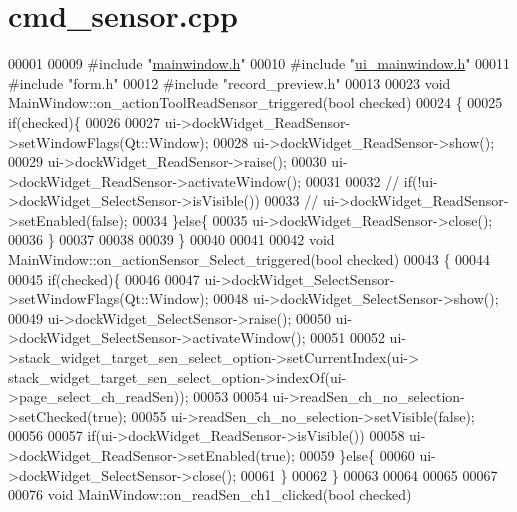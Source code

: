 \hypertarget{a00030_source}{\section{cmd\+\_\+sensor.\+cpp}
\label{a00030_source}
}

\begin{DoxyCode}
00001 
00009 \textcolor{preprocessor}{#include "\hyperlink{a00039}{mainwindow.h}"}
00010 \textcolor{preprocessor}{#include "\hyperlink{a00052}{ui\_mainwindow.h}"}
00011 \textcolor{preprocessor}{#include "form.h"}
00012 \textcolor{preprocessor}{#include "record\_preview.h"}
00013 
00023 \textcolor{keywordtype}{void} MainWindow::on\_actionToolReadSensor\_triggered(\textcolor{keywordtype}{bool} checked)
00024 \{
00025     \textcolor{keywordflow}{if}(checked)\{
00026 
00027         ui->dockWidget\_ReadSensor->setWindowFlags(Qt::Window);
00028         ui->dockWidget\_ReadSensor->show();
00029         ui->dockWidget\_ReadSensor->raise();
00030         ui->dockWidget\_ReadSensor->activateWindow();
00031 
00032       \textcolor{comment}{//  if(!ui->dockWidget\_SelectSensor->isVisible())}
00033            \textcolor{comment}{// ui->dockWidget\_ReadSensor->setEnabled(false);}
00034     \}\textcolor{keywordflow}{else}\{
00035         ui->dockWidget\_ReadSensor->close();
00036     \}
00037 
00038 
00039 \}
00040 
00041 
00042 \textcolor{keywordtype}{void} MainWindow::on\_actionSensor\_Select\_triggered(\textcolor{keywordtype}{bool} checked)
00043 \{
00044 
00045     \textcolor{keywordflow}{if}(checked)\{
00046 
00047         ui->dockWidget\_SelectSensor->setWindowFlags(Qt::Window);
00048         ui->dockWidget\_SelectSensor->show();
00049         ui->dockWidget\_SelectSensor->raise();
00050         ui->dockWidget\_SelectSensor->activateWindow();
00051 
00052         ui->stack\_widget\_target\_sen\_select\_option->setCurrentIndex(ui->
      stack\_widget\_target\_sen\_select\_option->indexOf(ui->page\_select\_ch\_readSen));
00053 
00054         ui->readSen\_ch\_no\_selection->setChecked(\textcolor{keyword}{true});
00055         ui->readSen\_ch\_no\_selection->setVisible(\textcolor{keyword}{false});
00056 
00057         \textcolor{keywordflow}{if}(ui->dockWidget\_ReadSensor->isVisible())
00058             ui->dockWidget\_ReadSensor->setEnabled(\textcolor{keyword}{true});
00059     \}\textcolor{keywordflow}{else}\{
00060         ui->dockWidget\_SelectSensor->close();
00061     \}
00062 \}
00063 
00064 
00065 
00067 
00076 \textcolor{keywordtype}{void} MainWindow::on\_readSen\_ch1\_clicked(\textcolor{keywordtype}{bool} checked)

\end{DoxyCode}
